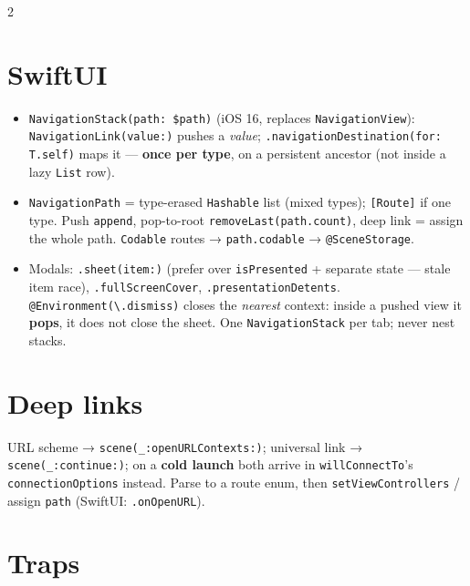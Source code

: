 \documentclass[8pt]{extarticle}
\begin{document}
\begin{multicols}{2}
\section{SwiftUI}
\begin{itemize}
  \item \texttt{NavigationStack(path: \$path)} (iOS 16, replaces \texttt{NavigationView}):
        \texttt{NavigationLink(value:)} pushes a \emph{value};
        \texttt{.navigationDestination(for: T.self)} maps it — \textbf{once per type}, on a
        persistent ancestor (not inside a lazy \texttt{List} row).
  \item \texttt{NavigationPath} = type-erased \texttt{Hashable} list (mixed types);
        \texttt{[Route]} if one type. Push \texttt{append}, pop-to-root
        \texttt{removeLast(path.count)}, deep link = assign the whole path.
        \texttt{Codable} routes → \texttt{path.codable} → \texttt{@SceneStorage}.
  \item Modals: \texttt{.sheet(item:)} (prefer over \texttt{isPresented} + separate state —
        stale item race), \texttt{.fullScreenCover}, \texttt{.presentationDetents}.
        \texttt{@Environment(\textbackslash.dismiss)} closes the \emph{nearest} context:
        inside a pushed view it \textbf{pops}, it does not close the sheet. One
        \texttt{NavigationStack} per tab; never nest stacks.
\end{itemize}

\section{Deep links}
URL scheme → \texttt{scene(\_:openURLContexts:)}; universal link →
\texttt{scene(\_:continue:)}; on a \textbf{cold launch} both arrive in
\texttt{willConnectTo}'s \texttt{connectionOptions} instead. Parse to a route enum, then
\texttt{setViewControllers} / assign \texttt{path} (SwiftUI: \texttt{.onOpenURL}).

\section{Traps}
\begin{itemize}
\end{itemize}


\end{multicols}
\end{document}

